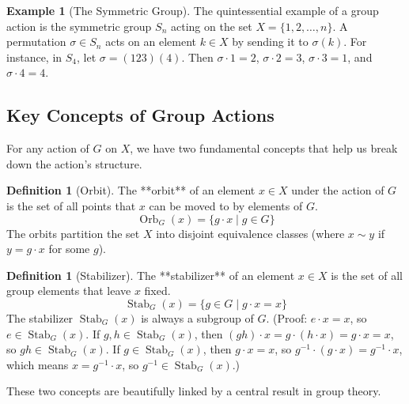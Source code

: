 \documentclass[12pt,a4paper]{article}
\theoremstyle{plain} %
\theoremstyle{definition} %
\newtheorem{definition}[theorem]{Definition}
\newtheorem{example}[theorem]{Example}
\theoremstyle{remark} %
\DeclareMathOperator{\Stab}{Stab}
\DeclareMathOperator{\Orb}{Orb}
\begin{document}
\begin{example}[The Symmetric Group]
The quintessential example of a group action is the symmetric group $S_n$ acting on the set $X = \{1, 2, \dots, n\}$. A permutation $\sigma \in S_n$ acts on an element $k \in X$ by sending it to $\sigma(k)$.
For instance, in $S_4$, let $\sigma = (123)(4)$. Then $\sigma \cdot 1 = 2$, $\sigma \cdot 2 = 3$, $\sigma \cdot 3 = 1$, and $\sigma \cdot 4 = 4$.
\end{example}

\subsection{Key Concepts of Group Actions}
For any action of $G$ on $X$, we have two fundamental concepts that help us break down the action's structure.

\begin{definition}[Orbit]
The **orbit** of an element $x \in X$ under the action of $G$ is the set of all points that $x$ can be moved to by elements of $G$.
\[
\Orb_G(x) = \{ g \cdot x \mid g \in G \}
\]
The orbits partition the set $X$ into disjoint equivalence classes (where $x \sim y$ if $y = g \cdot x$ for some $g$).
\end{definition}

\begin{definition}[Stabilizer]
The **stabilizer** of an element $x \in X$ is the set of all group elements that leave $x$ fixed.
\[
\Stab_G(x) = \{ g \in G \mid g \cdot x = x \}
\]
The stabilizer $\Stab_G(x)$ is always a subgroup of $G$. (Proof: $e \cdot x = x$, so $e \in \Stab_G(x)$. If $g, h \in \Stab_G(x)$, then $(gh)\cdot x = g \cdot (h \cdot x) = g \cdot x = x$, so $gh \in \Stab_G(x)$. If $g \in \Stab_G(x)$, then $g \cdot x = x$, so $g^{-1} \cdot (g \cdot x) = g^{-1} \cdot x$, which means $x = g^{-1} \cdot x$, so $g^{-1} \in \Stab_G(x)$.)
\end{definition}

These two concepts are beautifully linked by a central result in group theory.
\end{document}
